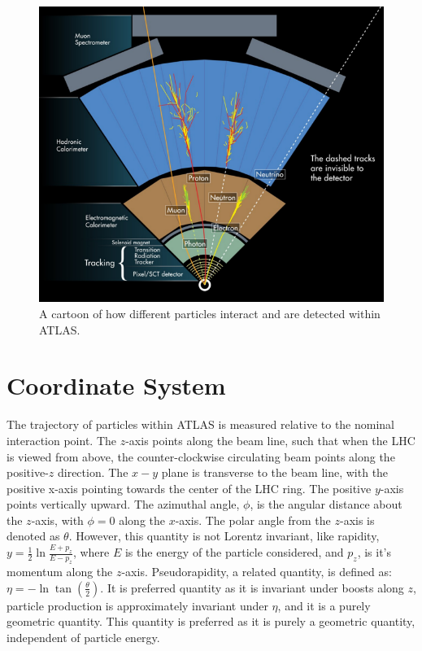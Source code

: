 \begin{figure}[h!]
  \centering
  \includegraphics[width=\hsize]{figures/Detector/particle_detection_atlas.png}
  \caption{A cartoon of how different particles interact and are detected within ATLAS.} 
  \label{fig:particle_detection}
\end{figure}
\FloatBarrier

\section{Coordinate System}
The trajectory of particles within ATLAS is measured relative to the nominal interaction point. The $z$-axis points along the beam line, such that when the LHC is viewed from above, the counter-clockwise circulating beam points along the positive-$z$ direction. The $x-y$ plane is transverse to the beam line, with the positive x-axis pointing towards the center of the LHC ring. The positive $y$-axis points vertically upward. The azimuthal angle, $\phi$, is the angular distance about the $z$-axis, with $\phi=0$ along the $x$-axis. The polar angle from the $z$-axis is denoted as $\theta$.  However, this quantity is not Lorentz invariant, like rapidity, $y=\frac{1}{2}\ln\frac{E+p_{z}}{E-p_{z}}$, where $E$ is the energy of the particle considered, and $p_{z}$, is it's momentum along the $z$-axis. Pseudorapidity, a related quantity, is defined as: $\eta = -\ln \tan(\frac{\theta}{2})$. It is preferred quantity as it is invariant under boosts along $z$, particle production is approximately invariant under $\eta$, and it is a purely geometric quantity. This quantity is preferred as it is purely a geometric quantity, independent of particle energy. 

